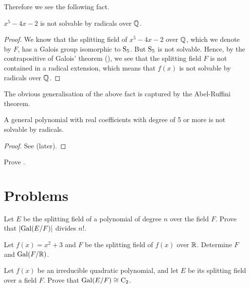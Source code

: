 Therefore we see the following fact.

\begin{proposition}
    $x^5 - 4x - 2$ is not solvable by radicals over $\mathbb{Q}$.
\end{proposition}
\begin{proof}
    We know that the splitting field of $x^5 - 4x - 2$ over $\mathbb{Q}$, which we denote by $F$, has a Galois group isomorphic to $\mathrm{S}_{5}$. But $\mathrm{S}_{5}$ is not solvable. Hence, by the contrapositive of Galois' theorem (), we see that the splitting field $F$ is not contained in a radical extension, which means that $f(x)$ is not solvable by radicals over $\mathbb{Q}$.
\end{proof}

The obvious generalisation of the above fact is captured by the Abel-Ruffini theorem.

\begin{theorem}\label{thrm-abel-ruffini}
    A general polynomial with real coefficients with degree of 5 or more is not solvable by radicals.
\end{theorem}
\begin{proof}
    See  (later).
\end{proof}

\begin{exercise}\label{exercise-prove-abel-ruffini}
    Prove .
\end{exercise}

\newpage

\section{Problems}
\begin{problem}
    Let $E$ be the splitting field of a polynomial of degree $n$ over the field $F$. Prove that $|\mathrm{Gal}(E/F)|$ divides $n!$.
\end{problem}

\begin{problem}
    Let $f(x) = x^2 + 3$ and $F$ be the splitting field of $f(x)$ over $\mathbb{R}$. Determine $F$ and $\mathrm{Gal}(F/\mathbb{R})$.
\end{problem}

\begin{problem}
    Let $f(x)$ be an irreducible quadratic polynomial, and let $E$ be its splitting field over a field $F$. Prove that $\mathrm{Gal}(E/F) \cong \mathrm{C}_{2}$.
\end{problem}

